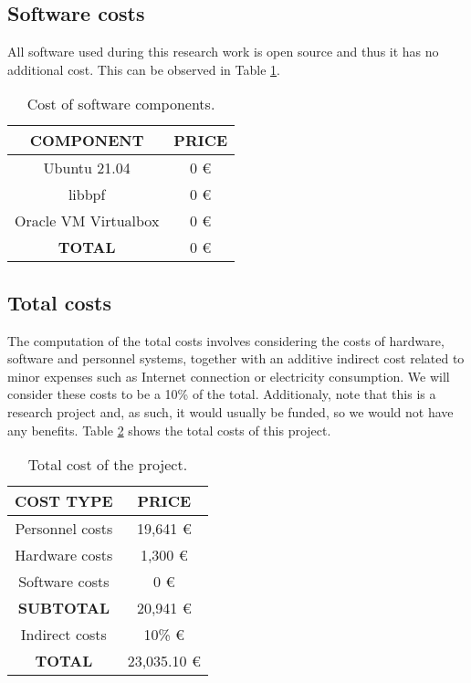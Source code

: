 \subsection{Software costs}
All software used during this research work is open source and thus it has no additional cost. This can be observed in Table \ref{table:software_costs}.
\begin{table}[htbp]
\begin{tabular}{|c|c|}
\hline
\textbf{COMPONENT} & \textbf{PRICE}\\
\hline
\hline
Ubuntu 21.04 & 0 € \\
\hline
libbpf & 0 € \\
\hline
Oracle VM Virtualbox & 0 € \\
\hline
\textbf{TOTAL} & 0 €\\
\hline
\end{tabular}
\caption{Cost of software components.}
\label{table:software_costs}
\end{table}

\subsection{Total costs}
The computation of the total costs involves considering the costs of hardware, software and personnel systems, together with an additive indirect cost related to minor expenses such as Internet connection or electricity consumption. We will consider these costs to be a 10\% of the total. Additionaly, note that this is a research project and, as such, it would usually be funded, so we would not have any benefits. Table \ref{table:total_costs} shows the total costs of this project.

\begin{table}[htbp]
\begin{tabular}{|c|c|}
\hline
\textbf{COST TYPE} & \textbf{PRICE}\\
\hline
\hline
Personnel costs & 19,641 € \\
\hline
Hardware costs & 1,300 € \\
\hline
Software costs & 0 € \\
\hline
\textbf{SUBTOTAL} & 20,941 €\\
\hline
Indirect costs & 10\% €\\
\hline
\textbf{TOTAL} & 23,035.10 €\\
\hline
\end{tabular}
\caption{Total cost of the project.}
\label{table:total_costs}
\end{table}

